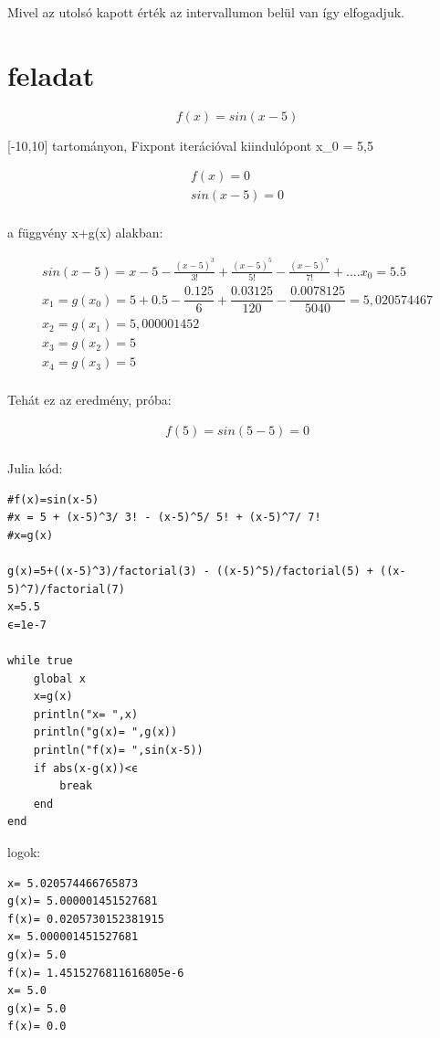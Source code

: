\documentclass{article}
\begin{document}
Mivel az utolsó kapott érték az intervallumon belül van így elfogadjuk.


\section{feladat}
\begin{equation}
f(x)= sin(x-5)
\end{equation}

[-10,10] tartományon, Fixpont iterációval kiindulópont x_0 = 5,5

\begin{multline}
f(x)=0\\
sin(x-5)=0\\
\end{multline}

a függvény x+g(x) alakban:

\begin{multline}
sin(x-5)=x-5-\frac{(x-5)^{3}}{3!}+\frac{(x-5)^{5}}{5!} - \frac{(x-5)^{7}}{7!} + ....
x_{0} = 5.5\\
x_{1} = g(x_0) = 5 + 0.5-\dfrac{0.125}{6}+\dfrac{0.03125}{120}-\dfrac{0.0078125}{5040} = 5,020574467\\
x_2 = g(x_1) = 5,000001452\\
x_3 = g(x_2) = 5\\
x_4 = g(x_3) = 5\\
\end{multline}

Tehát ez az eredmény, próba:

\begin{multline}
f(5) = sin(5-5) = 0\\
\end{multline}

Julia kód:

\begin{verbatim}
#f(x)=sin(x-5)
#x = 5 + (x-5)^3/ 3! - (x-5)^5/ 5! + (x-5)^7/ 7!
#x=g(x)

g(x)=5+((x-5)^3)/factorial(3) - ((x-5)^5)/factorial(5) + ((x-5)^7)/factorial(7)
x=5.5
ϵ=1e-7

while true
    global x
    x=g(x)
    println("x= ",x)
    println("g(x)= ",g(x))
    println("f(x)= ",sin(x-5))
    if abs(x-g(x))<ϵ
        break
    end
end
\end{verbatim}

logok:

\begin{verbatim}
x= 5.020574466765873   
g(x)= 5.000001451527681
f(x)= 0.0205730152381915   
x= 5.000001451527681       
g(x)= 5.0
f(x)= 1.4515276811616805e-6
x= 5.0
g(x)= 5.0
f(x)= 0.0
\end{verbatim}
\end{document}
